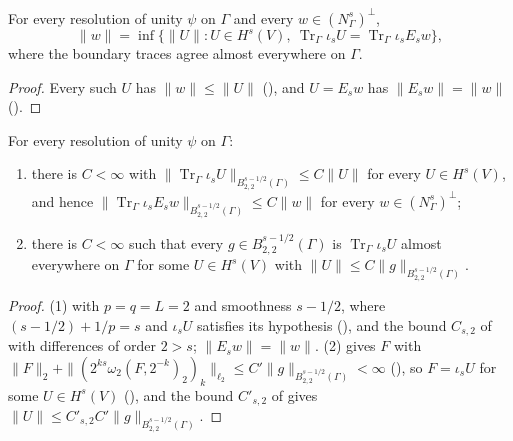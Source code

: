 \begin{theorem}
\label{thm:trace-space-least-extension}
\leanok
{}
For every resolution of unity $\psi$ on $\Gamma$ and every $w \in (N^s_\Gamma)^\perp$,
\[
  \|w\| = \inf \bigl\{\|U\| : U \in H^s(V),\ \operatorname{Tr}_\Gamma \iota_s U =
    \operatorname{Tr}_\Gamma \iota_s E_s w\bigr\},
\]
where the boundary traces agree almost everywhere on $\Gamma$.
\end{theorem}

\begin{proof}
\leanok
Every such $U$ has $\|w\| \leq \|U\|$ (), and $U = E_s w$ has
$\|E_s w\| = \|w\|$ ().
\end{proof}

\begin{lemma}
\label{lem:trace-space-norm-bounds}
\leanok
{}
For every resolution of unity $\psi$ on $\Gamma$:
\begin{enumerate}
  \item there is $C < \infty$ with
    $\|\operatorname{Tr}_\Gamma \iota_s U\|_{B^{s-1/2}_{2,2}(\Gamma)} \leq C \|U\|$ for every
    $U \in H^s(V)$, and hence
    $\|\operatorname{Tr}_\Gamma \iota_s E_s w\|_{B^{s-1/2}_{2,2}(\Gamma)} \leq C \|w\|$ for every
    $w \in (N^s_\Gamma)^\perp$;
  \item there is $C < \infty$ such that every $g \in B^{s-1/2}_{2,2}(\Gamma)$ is
    $\operatorname{Tr}_\Gamma \iota_s U$ almost everywhere on $\Gamma$ for some $U \in H^s(V)$
    with $\|U\| \leq C \|g\|_{B^{s-1/2}_{2,2}(\Gamma)}$.
\end{enumerate}
\end{lemma}

\begin{proof}
\leanok
(1)  with $p = q = L = 2$ and smoothness $s - 1/2$, where
$(s - 1/2) + 1/p = s$ and $\iota_s U$ satisfies its hypothesis
(), and the bound $C_{s,2}$ of
 with differences of order $2 > s$; $\|E_s w\| = \|w\|$. (2)
 gives $F$ with
$\|F\|_2 + \|(2^{ks} \omega_2(F, 2^{-k})_2)_k\|_{\ell_2}
\leq C' \|g\|_{B^{s-1/2}_{2,2}(\Gamma)} < \infty$
(), so $F = \iota_s U$ for some $U \in H^s(V)$
(), and the bound $C'_{s,2}$ of
 gives $\|U\| \leq C'_{s,2} C' \|g\|_{B^{s-1/2}_{2,2}(\Gamma)}$.
\end{proof}

